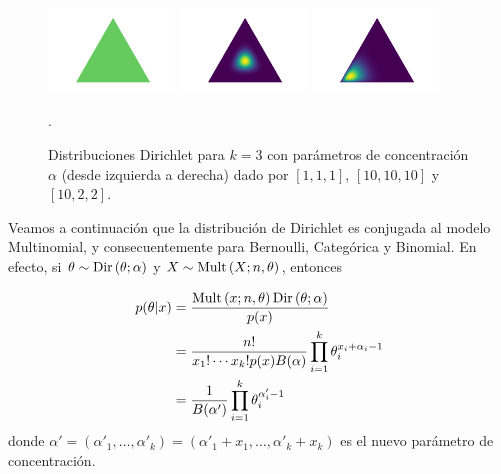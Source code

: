 \begin{figure}[H]
\includegraphics[width=0.3\textwidth]{img/dirichlet111.png}
\includegraphics[width=0.3\textwidth]{img/dirichlet101010.png}
\includegraphics[width=0.3\textwidth]{img/dirichlet1022.png}
\caption{Distribuciones Dirichlet para $k=3$ con parámetros de concentración $\alpha$ (desde izquierda a derecha) dado por $[1,1,1]$, $[10,10,10]$ y $[10,2,2]$. }.
\label{fig:dist_Dirichlet}
\centering
\end{figure}


Veamos a continuación que la distribución de Dirichlet es conjugada al modelo Multinomial, y consecuentemente para Bernoulli, Categórica y Binomial. En efecto, si $\theta \sim \text{Dir}\left(\theta;\alpha\right)$ y $X\sim\text{Mult}\left(X;n,\theta\right)$, entonces

\begin{align}
	p(\theta|x) &= \frac{\text{Mult}\left(x;n,\theta\right)\text{Dir}\left(\theta;\alpha\right)}{p(x)}\nonumber\\
				&=  \frac{n!}{ x_1!\cdots x_k!p(x) B(\alpha)} \prod_{i=1}^k \theta_i^{x_i + \alpha_i-1}\nonumber\\
				&=  \frac{1}{B(\alpha')} \prod_{i=1}^k \theta_i^{\alpha'_i-1}
				\label{eq:dirichlet_post}
\end{align}
donde $\alpha' = (\alpha'_1,\ldots,\alpha'_k) = (\alpha'_1 + x_1,\ldots,\alpha'_k+ x_k)$ es el nuevo parámetro de concentración.

